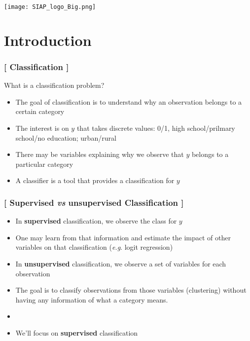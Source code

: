 \documentclass[xcolor=x11names,compress, handhouts]{beamer}
\renewcommand{\(}{\begin{columns}}
\renewcommand{\)}{\end{columns}}
\newcommand{\<}[1]{\begin{column}{#1}}
\renewcommand{\>}{\end{column}}
\begin{document}
\begin{frame}
\Large{ \color{siap}{Machine Learning for Official Statistics and SDGs}}

\hspace{1cm}


\hspace{2cm}
\begin{center}

\texttt{[image: SIAP\_logo\_Big.png]}

\end{center}
\end{frame}



\section{Introduction}

\begin{frame} %

\frametitle{\textcolor{brique}{[ Classification ]}}
What is a classification problem?
\pause
\begin{itemize}[<+->]
  \item The goal of classification is to understand why an observation belongs to a certain category
  \item The interest is on $y$ that takes discrete values:  0/1, high school/prilmary school/no education; urban/rural
  \item There may be variables explaining why we observe that $y$ belongs to a particular category
  \item A classifier is a tool that  provides a classification for $y$
\end{itemize}
\end{frame}

\begin{frame} %
\frametitle{\textcolor{brique}{[ Supervised \textit{vs} unsupervised Classification ]}}
\pause
\begin{itemize}[<+->]
  \item In \textbf{supervised }classification, we observe the class for  $y$
  \item[] One may learn from that information and estimate the impact of other variables on that classification (\textit{e.g}. logit regression)
   \item In \textbf{unsupervised }classification, we observe a set of variables for each observation
  \item[]  The goal is to classify observations from those variables (clustering) without having any information of what a category means.
  \item[]
  \item We'll focus on \textbf{supervised }classification
\end{itemize}
\end{frame}
\end{document}
